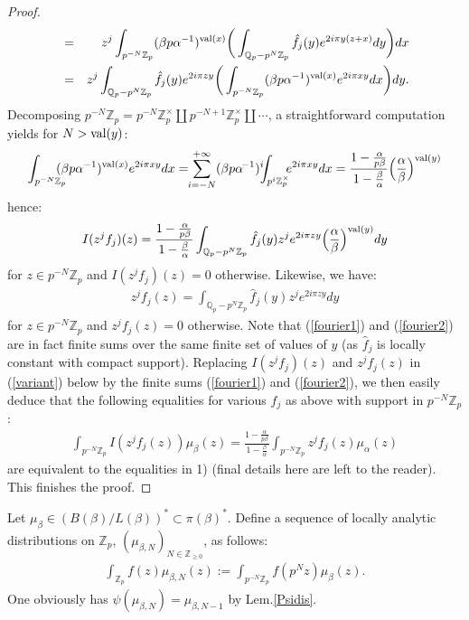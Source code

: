 \documentclass[11pt]{amsart}
\def\Z{{\mathbb Z}_p}
\def\Q{{\mathbb Q}_p}
\begin{document}
\begin{proof}
\begin{eqnarray*}
&=&z^j\int_{p^{-N}\Z}(\beta p\alpha^{-1})^{{\rm val}(x)}
\bigg(\int_{\Q-p^N\Z}\hat f_j(y)e^{2i\pi y(z+x)}dy\bigg)dx\\ 
&=&z^j\int_{\Q-p^N\Z}\hat f_j(y)e^{2i\pi zy}\bigg(\int_{p^{-N}\Z}
(\beta p\alpha^{-1})^{{\rm val}(x)}e^{2i\pi xy}dx\bigg)dy. 
\end{eqnarray*} 
Decomposing $p^{-N}\Z=p^{-N}\Z^{\times}\amalg p^{-N+1}
\Z^{\times}\amalg\cdots$, a straightforward computation yields 
for $N>{\rm val}(y)$: 
$$\int_{p^{-N}\Z}\!\!\!\!\!(\beta p\alpha^{-1})^{{\rm val}(x)}e^{2i\pi
  xy}dx=\!\!\sum_{i=-N}^{+\infty}(\beta
p\alpha^{\!-1})^i\!\!\!\int_{p^i\Z^{\times}}\!\!\!e^{2i\pi
  xy}dx=\frac{1-\frac{\alpha}{p\beta}}{1-\frac{\beta}
{\alpha}}\Big(\frac{\alpha}{\beta}\Big)^{{\rm val}(y)}$$  
hence: 
\begin{eqnarray}\label{fourier1} 
I(z^jf_j)(z)=\frac{1-\frac{\alpha}{p\beta}}{1-\frac{\beta}
{\alpha}}\int_{\Q-p^N\Z}\hat f_j(y)z^je^{2i\pi zy}\Big(\frac{\alpha}
{\beta}\Big)^{{\rm val}(y)}dy 
\end{eqnarray} 
for $z\in p^{-N}\Z$ and $I(z^jf_j)(z)=0$ otherwise. Likewise, we have:  
\begin{eqnarray}\label{fourier2} 
z^jf_j(z)=\int_{\Q-p^N\Z}\hat f_j(y)z^je^{2i\pi zy}dy 
\end{eqnarray} 
for $z\in p^{-N}\Z$ and $z^jf_j(z)=0$ otherwise. Note that
(\ref{fourier1}) and (\ref{fourier2}) are in fact finite sums over the
same finite set of values of $y$ (as $\hat f_j$ is locally constant
with compact support). Replacing $I(z^jf_j)(z)$ and $z^jf_j(z)$ in
(\ref{variant}) below by the finite sums (\ref{fourier1}) and
(\ref{fourier2}), we then easily deduce that the following equalities
for various $f_j$ as above with support in $p^{-N}\Z$:  
\begin{eqnarray}\label{variant} 
\int_{p^{-N}\Z}I(z^jf_j(z))\mu_{\beta}(z)=\frac{1-\frac{\alpha}
{p\beta}}{1-\frac{\beta}{\alpha}}\int_{p^{-N}\Z}z^jf_j(z)\mu_{\alpha}(z) 
\end{eqnarray} 
are equivalent to the equalities in 1) (final details here are 
left to the reader). This finishes the proof. 
\end{proof} 
 
Let $\mu_{\beta}\in (B(\beta)/L(\beta))^{*}\subset \pi(\beta)^*$. 
Define a sequence of locally analytic distributions on $\Z$, 
$(\mu_{\beta,N})_{N\in {\mathbb Z}_{\geq 0}}$, as follows: 
\begin{eqnarray*} 
\int_{\Z}f(z)\mu_{\beta,N}(z):=\int_{p^{-N}\Z}f(p^Nz)\mu_{\beta}(z). 
\end{eqnarray*} 
One obviously has $\psi(\mu_{\beta,N})=\mu_{\beta,N-1}$ by Lem.\ref{Psidis}. 
 
\end{document}
